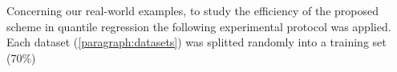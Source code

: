 %
%
%
Concerning our real-world examples, to study the efficiency of the proposed
scheme in quantile regression the
following experimental protocol was applied. Each dataset
(\cref{paragraph:datasets}) was splitted randomly into a training set (70\%)

